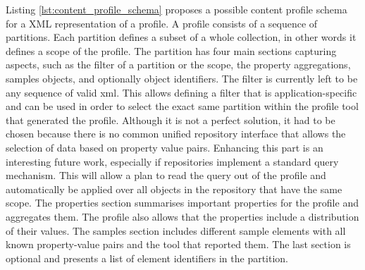 Listing \ref{lst:content_profile_schema} proposes a possible content profile schema for a XML representation of a profile. A profile consists of a sequence of partitions. Each partition defines a subset of a whole collection, in other words it defines a scope of the profile. The partition has four main sections capturing aspects, such as the filter of a partition or the scope, the property aggregations, samples objects, and optionally object identifiers. The filter is currently left to be any sequence of valid xml. This allows defining a filter that is application-specific and can be used in order to select the exact same partition within the profile tool that generated the profile. Although it is not a perfect solution, it had to be chosen because there is no common unified repository interface that allows the selection of data based on property value pairs. Enhancing this part is an interesting future work, especially if repositories implement a standard query mechanism. This will allow a plan to read the query out of the profile and automatically be applied over all objects in the repository that have the same scope.
The properties section summarises important properties for the profile and aggregates them. The profile also allows that the properties include a distribution of their values.
The samples section includes different sample elements with all known property-value pairs and the tool that reported them.
The last section is optional and presents a list of element identifiers in the partition.
\clearpage

